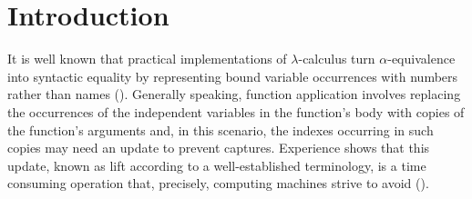 \documentclass{article}
\theoremstyle{plain}
\theoremstyle{definition}
\begin{document}
\newcommand{\nindex}[1]{\index{author}{#1}}
\newcommand{\dindex}[1]{\index{definition}{#1}}
\newcommand{\tindex}[1]{\index{technot}{#1}}
\newcommand{\sindex}[1]{\index{subject}{#1}}

\newcommand{\textps}{\textprimstress}
\newcommand{\textss}{\textsecstress}
\newcommand{\calD}{{\cal D}}
\newcommand{\calR}{{\cal R}}
\newcommand{\calT}{{\cal T}}
\newcommand{\calE}{{\cal E}}
\newcommand{\calED}{{\calE_{\lambda D}}}
\newcommand{\calEDn}{{\calE_{\lamDn}}}
\newcommand{\calEDu}{{\calE_{\lamDu}}}
\newcommand{\calEDp}{\calE_{\lamDp}}
\newcommand{\calB}{{\cal B}}
\newcommand{\calV}{{\cal V}}


\newcommand{\calAn}{{\cal A}_0}
\newcommand{\calAo}{{\cal A}_1}
\newcommand{\calAi}{{\cal A}_i}
\newcommand{\ovx}{\overline x}
\newcommand{\ovy}{\overline y}


\newcommand{\bif}{{\sf if}}
\newcommand{\Zero}{{\sf Zero}}
\newcommand{\bthen}{{\sf then}}
\newcommand{\belse}{{\sf else}}
\newcommand{\Mult}{{\sf Mult}}
\newcommand{\Pred}{{\sf Pred}}

\newcommand{\List}{{\sf List}}
\newcommand{\IN}{{\mathbb N}}

\newcommand{\sss}{\scriptstyle\;}


\newcommand{\ttp}{\tt p}
\newcommand{\ttTy}{\tt T}
\newcommand{\ttA}{\tt A}
\newcommand{\ttl}{\tt l}

\newcommand{\renlab}{\renewcommand{\labelitemi}{$-$}}%
\newcommand{\listbegin}{\vspace{-1ex}\begin{itemize}\renlab}
\newcommand{\listend}{\end{itemize}\vspace{-1ex}}




\section{Introduction}
\label{SecInt}

It is well known that practical implementations of $\lambda$-calculus
turn $\alpha$-equivalence into syntactic equality
by representing bound variable occurrences
with numbers rather than names (\citealp{deB72}).
Generally speaking, function application involves replacing the
occurrences of the independent variables in the function's body
with copies of the function's arguments
and, in this scenario, the indexes occurring in such copies
may need an update to prevent captures.
Experience shows that this update,
known as lift according to a well-established terminology,
is a time consuming operation \cite[Appendix A2]{Gui09}
that, precisely, computing machines strive to avoid (\citealp{Klu05}).
\end{document}
